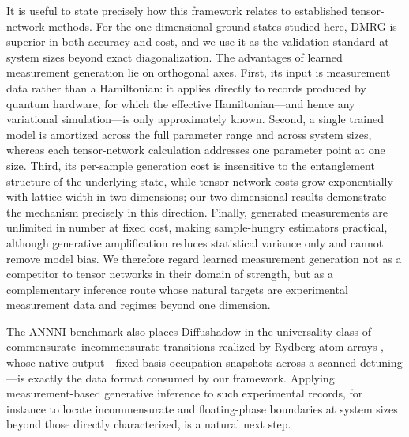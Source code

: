It is useful to state precisely how this framework relates to established
tensor-network methods. For the one-dimensional ground states studied
here, DMRG is superior in both accuracy and cost, and we use it as the
validation standard at system sizes beyond exact diagonalization. The
advantages of learned measurement generation lie on orthogonal axes.
First, its input is measurement data rather than a Hamiltonian: it applies
directly to records produced by quantum hardware, for which the effective
Hamiltonian---and hence any variational simulation---is only approximately
known. Second, a single trained model is amortized across the full
parameter range and across system sizes, whereas each tensor-network
calculation addresses one parameter point at one size. Third, its
per-sample generation cost is insensitive to the entanglement structure of
the underlying state, while tensor-network costs grow exponentially with
lattice width in two dimensions; our two-dimensional results demonstrate
the mechanism precisely in this direction. Finally, generated measurements
are unlimited in number at fixed cost, making sample-hungry estimators
practical, although generative amplification reduces statistical variance
only and cannot remove model bias. We therefore regard learned measurement
generation not as a competitor to tensor networks in their domain of
strength, but as a complementary inference route whose natural targets are
experimental measurement data and regimes beyond one dimension.


The ANNNI benchmark also places Diffushadow in the universality class of
commensurate--incommensurate transitions realized by Rydberg-atom arrays
\cite{ebadi2021quantum, chepiga2019floating}, whose native output---fixed-basis
occupation snapshots across a scanned detuning---is exactly the data format
consumed by our framework. Applying measurement-based generative inference
to such experimental records, for instance to locate incommensurate and
floating-phase boundaries at system sizes beyond those directly
characterized, is a natural next step. %

